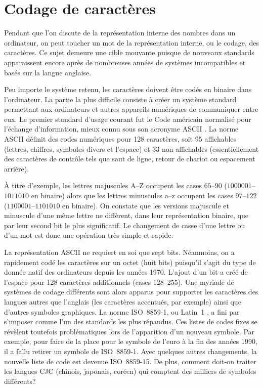 \documentclass[letterpaper,11pt]{memoir}
\theoremstyle{plain}
\theoremstyle{definition}
\theoremstyle{remark}
\begin{document}
\section{Codage de caractères}
\label{sec:ordinateurs:codage}

Pendant que l'on discute de la représentation interne des nombres dans
un ordinateur, on peut toucher un mot de la représentation interne, ou
le codage, des caractères. Ce sujet demeure une cible mouvante puisque
de nouveaux standards apparaissent encore après de nombreuses années
de systèmes incompatibles et basés sur la langue anglaise.

Peu importe le système retenu, les caractères doivent être codés en
binaire dans l'ordinateur. La partie la plus difficile consiste à
créer un système standard permettant aux ordinateurs et autres
appareils numériques de communiquer entre eux. Le premier standard
d'usage courant fut le Code américain normalisé pour l'échange
d'information, mieux connu sous son acronyme ASCII \citep{ASCII}. La
norme ASCII définit des codes numériques pour 128 caractères, soit 95
affichables (lettres, chiffres, symboles divers et l'espace) et 33 non
affichables (essentiellement des caractères de contrôle tels que saut
de ligne, retour de chariot ou espacement arrière).

À titre d'exemple, les lettres majuscules A--Z occupent les cases
$65$--$90$ ($1000001$--$1011010$ en binaire) alors que les lettres
minuscules a--z occupent les cases $97$--$122$ ($1100001$--$1101010$
en binaire). On constate que les versions majuscule et minuscule d'une
même lettre ne diffèrent, dans leur représentation binaire, que par
leur second bit le plus significatif. Le changement de casse d'une
lettre ou d'un mot est donc une opération très simple et rapide.

La représentation ASCII ne requiert en soi que sept bits. Néanmoins,
on a rapidement codé les caractères sur un octet (huit bits) puisqu'il
s'agit du type de donnée natif des ordinateurs depuis les années 1970.
L'ajout d'un bit a créé de l'espace pour 128 caractères additionnels
(cases 128--255). Une myriade de systèmes de codage différents sont
alors apparus pour supporter les caractères des langues autres que
l'anglais (les caractères accentués, par exemple) ainsi que d'autres
symboles graphiques. La norme ISO~8859-1, ou Latin~1
\citep{ISO:8859-1}, a fini par s'imposer comme l'un des standards les
plus répandus. Ces listes de codes fixes se révèlent toutefois
problématiques lors de l'apparition d'un nouveau symbole. Par exemple,
pour faire de la place pour le symbole de l'euro à la fin des années
1990, il a fallu retirer un symbole de ISO~8859-1. Avec quelques
autres changements, la nouvelle liste de code est devenue ISO~8859-15.
De plus, comment doit-on traiter les langues CJC (chinois, japonais,
coréen) qui comptent des milliers de symboles différents?
\end{document}
